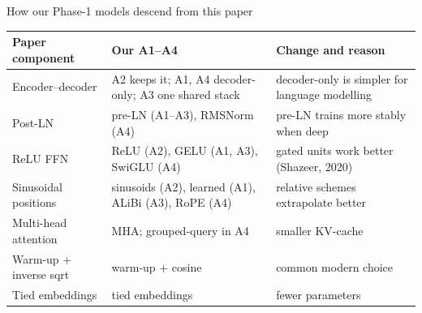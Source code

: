 \documentclass[aspectratio=169,11pt]{beamer}
\begin{document}
\begin{frame}{How our Phase-1 models descend from this paper}
  \small
  \begin{tabularx}{\textwidth}{@{}lXX@{}}
    \toprule
    Paper component & Our A1--A4 & Change and reason\\
    \midrule
    Encoder--decoder & A2 keeps it; A1, A4 decoder-only; A3 one shared stack & decoder-only is simpler for language modelling\\
    Post-LN & pre-LN (A1--A3), RMSNorm (A4) & pre-LN trains more stably when deep\\
    ReLU FFN & ReLU (A2), GELU (A1, A3), SwiGLU (A4) & gated units work better (Shazeer, 2020)\\
    Sinusoidal positions & sinusoids (A2), learned (A1), ALiBi (A3), RoPE (A4) & relative schemes extrapolate better\\
    Multi-head attention & MHA; grouped-query in A4 & smaller KV-cache\\
    Warm-up + inverse sqrt & warm-up + cosine & common modern choice\\
    Tied embeddings & tied embeddings & fewer parameters\\
    \bottomrule
  \end{tabularx}
\end{frame}
\end{document}
